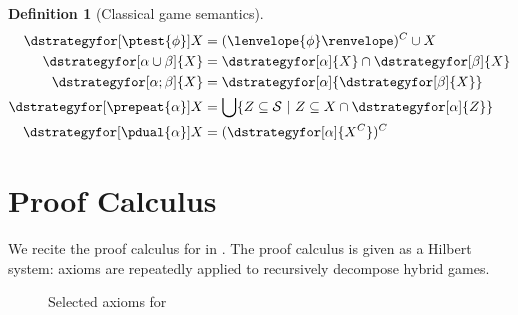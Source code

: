 \documentclass[12pt]{cmuthesis}
\theoremstyle{definition}
\newtheorem{definition}{Definition}
\theoremstyle{remark}
\newcommand{\rref}[2][]{\prettyref{#2}}
\newcommand{\allstate}{\mathcal{S}}
\newcommand{\fint}[1]{\lenvelope{#1}\renvelope}
\begin{document}
\begin{definition}[Classical game semantics]
\begin{align*}
\dstrategyfor[\ptest{\phi}]{X}         &= (\fint{\phi})^C \cup X\\
\dstrategyfor[\alpha\cup\beta]{X}   &= \dstrategyfor[\alpha]{X} \cap \dstrategyfor[\beta]{X}\\
\dstrategyfor[\alpha;\beta]{X}      &=  \dstrategyfor[\alpha]{\dstrategyfor[\beta]{X}}\\
\dstrategyfor[\prepeat{\alpha}]{X}  &= \bigcup\{Z \subseteq \allstate~|~ Z \subseteq X \cap \dstrategyfor[\alpha]{Z}\}\\
\dstrategyfor[\pdual{\alpha}]{X}    &= (\dstrategyfor[\alpha]{X^C})^C
\end{align*}
\end{definition}


\section{Proof Calculus}
We recite the proof calculus for \dGL in \rref{fig:dgl-axioms}.
The proof calculus is given as a Hilbert system: axioms are repeatedly applied to recursively decompose hybrid games.
\begin{figure}
  \centering
  \begin{calculuscollections}{\columnwidth}
    \begin{calculus}
\cinferenceRule[dglbox|{$[\cdot]$}]{}
{
\linferenceRule[equiv]{\dbox{\alpha}{\phi}}{\neg\ddiamond{\alpha}{\neg\phi}}
}{}
\cinferenceRule[dglassign|{$\langle:=\rangle$}]{}
{
}{}
{
}{}
{
}{}
{
\linferenceRule[equiv]{\ddiamond{\ptest{\psi}}{\phi}}{(\phi \land \psi)}
}{}
{
\linferenceRule[equiv]{\ddiamond{\alpha \cup \beta}{\phi}}{\ddiamond{\alpha}{\phi} \lor \ddiamond{\beta}{\phi}}
}{}
{
\linferenceRule[equiv]{\ddiamond{\alpha;\beta}{\phi}}{\ddiamond{\alpha}{\ddiamond{\beta}{\phi}}}
}{}
{
\linferenceRule[impl]{\phi\lor\ddiamond{\alpha}{\ddiamond{\prepeat{\alpha}}{\phi}}}{\ddiamond{\prepeat{\alpha}}{\phi}}
}{}
{
\linferenceRule[equiv]{\ddiamond{\pdual{\alpha}}{\phi}}{\neg\ddiamond{\alpha}{\neg\phi}}
}{}
\cinferenceRule[dglMon|M]{}
{
\linferenceRule[formula]{\phi\limply\psi}{\ddiamond{\alpha}{\phi}\limply\ddiamond{\alpha}{\psi}}
}{}
\cinferenceRule[dglfixpoint|FP]{}
{
\linferenceRule[formula]{\phi\lor\ddiamond{\alpha}{\psi} \limply \psi}{\ddiamond{\prepeat{\alpha}}{\phi} \to \psi}
}{}
    \end{calculus}
  \end{calculuscollections}
  \caption{Selected axioms for \dGL}
  \label{fig:dgl-axioms}
\end{figure}
\end{document}
